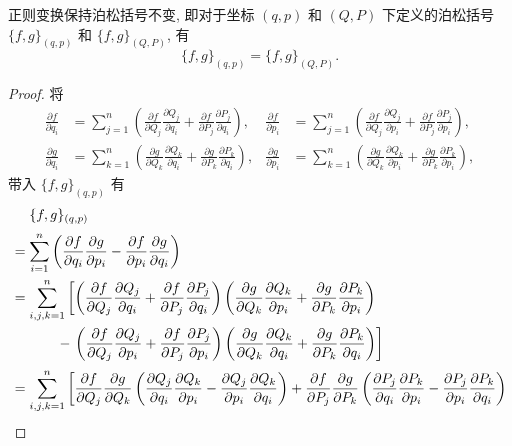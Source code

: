 \begin{theorem}
    正则变换保持泊松括号不变, 即对于坐标 $ (q,p) $ 和 $ (Q,P) $ 下定义的泊松括号 $ \{f,g\}_{(q,p)} $ 和 $ \{f,g\}_{(Q,P)} $, 有
    \[ \{f,g\}_{(q,p)}=\{f,g\}_{(Q,P)}. \]
\end{theorem}
\begin{proof}
    将
    \begin{align*}
        \frac{\partial f}{\partial q_i} &= \sum_{j=1}^{n}\left( \frac{\partial f}{\partial Q_j}\frac{\partial Q_j}{\partial q_i}+\frac{\partial f}{\partial P_j}\frac{\partial P_j}{\partial q_i} \right), &
        \frac{\partial f}{\partial p_i} &= \sum_{j=1}^{n}\left( \frac{\partial f}{\partial Q_j}\frac{\partial Q_j}{\partial p_i}+\frac{\partial f}{\partial P_j}\frac{\partial P_j}{\partial p_i} \right), \\
        \frac{\partial g}{\partial q_i} &= \sum_{k=1}^{n}\left( \frac{\partial g}{\partial Q_k}\frac{\partial Q_k}{\partial q_i}+\frac{\partial g}{\partial P_k}\frac{\partial P_k}{\partial q_i} \right), &
        \frac{\partial g}{\partial p_i} &= \sum_{k=1}^{n}\left( \frac{\partial g}{\partial Q_k}\frac{\partial Q_k}{\partial p_i}+\frac{\partial g}{\partial P_k}\frac{\partial P_k}{\partial p_i} \right),
    \end{align*}
    带入 $ \{f,g\}_{(q,p)} $ 有
    \begin{align*}
        &\phantom{=}\;\;\{f,g\}_{(q,p)}\\[2pt]
        &= \sum_{i=1}^{n}\left( \frac{\partial f}{\partial q_i}\frac{\partial g}{\partial p_i}-\frac{\partial f}{\partial p_i}\frac{\partial g}{\partial q_i} \right)\\
        &= \sum_{i,j,k=1}^{n}\left[ \left( \frac{\partial f}{\partial Q_j}\frac{\partial Q_j}{\partial q_i}+\frac{\partial f}{\partial P_j}\frac{\partial P_j}{\partial q_i} \right)\left( \frac{\partial g}{\partial Q_k}\frac{\partial Q_k}{\partial p_i}+\frac{\partial g}{\partial P_k}\frac{\partial P_k}{\partial p_i} \right)\right.\\ 
        &\hspace{32.7pt}-\left.\left( \frac{\partial f}{\partial Q_j}\frac{\partial Q_j}{\partial p_i}+\frac{\partial f}{\partial P_j}\frac{\partial P_j}{\partial p_i} \right)\left( \frac{\partial g}{\partial Q_k}\frac{\partial Q_k}{\partial q_i}+\frac{\partial g}{\partial P_k}\frac{\partial P_k}{\partial q_i} \right)\right]\\[2pt]
        &=\sum_{i,j,k=1}^{n}\left[\frac{\partial f}{\partial Q_j}\frac{\partial g}{\partial Q_k}\left( \frac{\partial Q_j}{\partial q_i}\frac{\partial Q_k}{\partial p_i}-\frac{\partial Q_j}{\partial p_i}\frac{\partial Q_k}{\partial q_i} \right) + \frac{\partial f}{\partial P_j}\frac{\partial g}{\partial P_k}\left( \frac{\partial P_j}{\partial q_i}\frac{\partial P_k}{\partial p_i}-\frac{\partial P_j}{\partial p_i}\frac{\partial P_k}{\partial q_i} \right)\right.\\

\end{align*}
\end{proof}
